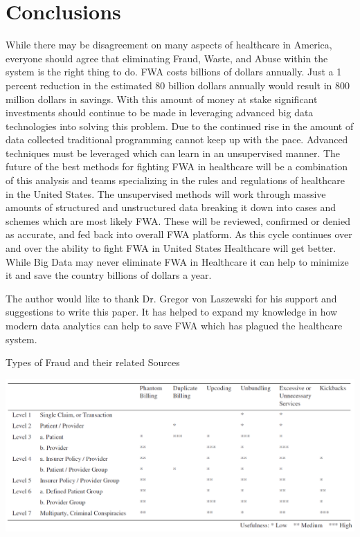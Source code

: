 \documentclass[sigconf]{acmart}
\begin{document}
\section{Conclusions}

While there may be disagreement on many aspects of healthcare in America, everyone should agree 
that eliminating Fraud, Waste, and Abuse within the system is the right thing to do.  FWA costs 
billions of dollars annually.  Just a 1 percent reduction in the estimated 80 billion dollars 
annually would result in 800 million dollars in savings.  With this amount of money at stake 
significant investments should continue to be made in leveraging advanced big data technologies 
into solving this problem.  Due to the continued rise in the amount of data collected traditional 
programming cannot keep up with the pace.  Advanced techniques must be leveraged which can learn 
in an unsupervised manner.  The future of the best methods for fighting FWA in healthcare will be 
a combination of this analysis and teams specializing in the rules and regulations of healthcare
in the United States.  The unsupervised methods will work through massive amounts of structured and 
unstructured data breaking it down into cases and schemes which are most likely FWA.  These will be 
reviewed, confirmed or denied as accurate, and fed back into overall FWA platform.  As this cycle 
continues over and over the ability to fight FWA in United States Healthcare will get better.  
While Big Data may never eliminate FWA in Healthcare it can help to minimize it and save the
country billions of dollars a year.

\begin{acks}

  The author would like to thank Dr. Gregor von Laszewski for his
  support and suggestions to write this paper.  It has helped to expand my knowledge in how modern 
  data analytics can help to save FWA which has plagued the healthcare system.

\end{acks}


 

\begin{table}[htb]
    \caption{Types of Fraud and their related Sources\cite{THORNTON20131252}}
    \label{fig:TypesofFraud}
    \includegraphics[scale=0.60]{images/TypesofFraud.png}
\end{table}
\end{document}
